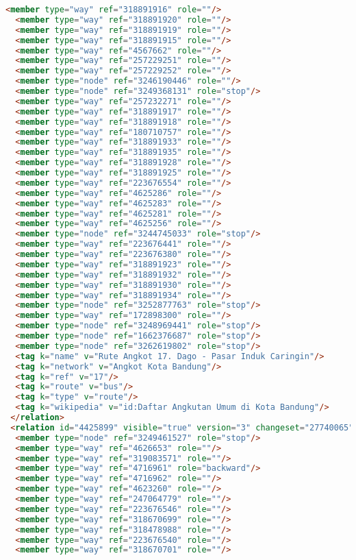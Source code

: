\begin{lstlisting}[language=HTML,basicstyle=\tiny,caption=bandung1.xml]
  <member type="way" ref="318891916" role=""/>
  <member type="way" ref="318891920" role=""/>
  <member type="way" ref="318891919" role=""/>
  <member type="way" ref="318891915" role=""/>
  <member type="way" ref="4567662" role=""/>
  <member type="way" ref="257229251" role=""/>
  <member type="way" ref="257229252" role=""/>
  <member type="node" ref="3246190446" role=""/>
  <member type="node" ref="3249368131" role="stop"/>
  <member type="way" ref="257232271" role=""/>
  <member type="way" ref="318891917" role=""/>
  <member type="way" ref="318891918" role=""/>
  <member type="way" ref="180710757" role=""/>
  <member type="way" ref="318891933" role=""/>
  <member type="way" ref="318891935" role=""/>
  <member type="way" ref="318891928" role=""/>
  <member type="way" ref="318891925" role=""/>
  <member type="way" ref="223676554" role=""/>
  <member type="way" ref="4625286" role=""/>
  <member type="way" ref="4625283" role=""/>
  <member type="way" ref="4625281" role=""/>
  <member type="way" ref="4625256" role=""/>
  <member type="node" ref="3244745033" role="stop"/>
  <member type="way" ref="223676441" role=""/>
  <member type="way" ref="223676380" role=""/>
  <member type="way" ref="318891923" role=""/>
  <member type="way" ref="318891932" role=""/>
  <member type="way" ref="318891930" role=""/>
  <member type="way" ref="318891934" role=""/>
  <member type="node" ref="3252877763" role="stop"/>
  <member type="way" ref="172898300" role=""/>
  <member type="node" ref="3248969441" role="stop"/>
  <member type="node" ref="1662376687" role="stop"/>
  <member type="node" ref="3262619802" role="stop"/>
  <tag k="name" v="Rute Angkot 17. Dago - Pasar Induk Caringin"/>
  <tag k="network" v="Angkot Kota Bandung"/>
  <tag k="ref" v="17"/>
  <tag k="route" v="bus"/>
  <tag k="type" v="route"/>
  <tag k="wikipedia" v="id:Daftar Angkutan Umum di Kota Bandung"/>
 </relation>
 <relation id="4425899" visible="true" version="3" changeset="27740065" timestamp="2014-12-27T20:46:39Z" user="gnocin" uid="2526082">
  <member type="node" ref="3249461527" role="stop"/>
  <member type="way" ref="4626653" role=""/>
  <member type="way" ref="319083571" role=""/>
  <member type="way" ref="4716961" role="backward"/>
  <member type="way" ref="4716962" role=""/>
  <member type="way" ref="4623260" role=""/>
  <member type="way" ref="247064779" role=""/>
  <member type="way" ref="223676546" role=""/>
  <member type="way" ref="318670699" role=""/>
  <member type="way" ref="318478988" role=""/>
  <member type="way" ref="223676540" role=""/>
  <member type="way" ref="318670701" role=""/>

\end{lstlisting}
